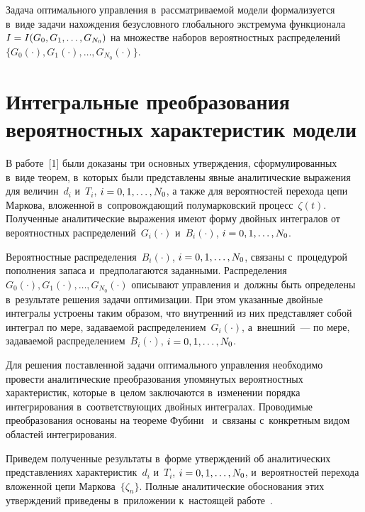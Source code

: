 \begin{multicols}{2}
  Задача оптимального управления в~рас\-смат\-ри\-ва\-емой
   модели формализуется в~виде задачи нахождения без\-услов\-но\-го 
   глобального экст\-ре\-му\-ма функционала 
$I\hm= I(G_0, G_1, \ldots , G_{N_0})$ на множестве наборов вероятностных 
распределений $\{G_0(\cdot), G_1(\cdot), \ldots , G_{N_0}(\cdot)\}$.
  
\section{Интегральные преобразования вероятностных характеристик 
модели}

  В работе~[1] были доказаны три основных утверж\-де\-ния, сформулированных 
в~виде тео\-рем, в~которых были пред\-став\-ле\-ны явные аналитические выражения 
для величин~$d_i$ и~$T_i$, $i\hm=0,1,\ldots , N_0$, а также для вероятностей 
перехода цепи Маркова, вложенной в~со\-про\-вож\-да\-ющий полумарковский 
процесс~$\zeta(t)$. Полученные аналитические выражения име\-ют форму 
двойных интегралов от вероятностных распределений~$G_i(\cdot)$ 
и~$B_i(\cdot)$, $i\hm=0,1,\ldots, N_0$.
  
  Вероятностные распределения~$B_i(\cdot)$, $i\hm=0,1,\ldots ,N_0$, связаны 
с~процедурой пополнения запаса и~пред\-по\-ла\-га\-ют\-ся заданными. 
Рас\-пре\-де\-ле\-ния 
$G_0(\cdot), G_1(\cdot), \ldots , G_{N_0}(\cdot)$ описывают управ\-ле\-ния 
и~должны быть определены в~результате решения задачи оптимизации. При 
этом указанные двойные интегралы устро\-ены таким образом, что внут\-рен\-ний 
из них пред\-став\-ля\-ет собой интеграл по мере, за\-да\-ва\-емой 
распределением~$G_i(\cdot)$, а~внеш\-ний~--- по мере, за\-да\-ва\-емой 
распределением~$B_i(\cdot)$, $i\hm=0,1,\ldots ,N_0$.
  
  Для решения поставленной задачи оптимального управ\-ле\-ния необходимо 
про\-вес\-ти аналитические преобразования упомянутых вероятностных 
характеристик, которые в~целом за\-клю\-ча\-ют\-ся в~изменении порядка 
интегрирования в~со\-от\-вет\-ст\-ву\-ющих двойных интегралах. Проводимые 
пре\-об\-ра\-зо\-ва\-ния основаны на тео\-ре\-ме Фубини~\cite{5-sh} и~связаны 
с~конкретным видом областей интегрирования. 

Приведем полученные 
результаты в~форме утверж\-де\-ний об аналитических пред\-став\-ле\-ни\-ях 
характеристик~$d_i$ и~$T_i$, $i\hm=0,1,\ldots, N_0$, и~вероятностей перехода 
вло\-жен\-ной цепи Маркова~$\{\zeta_n\}$. Пол\-ные аналитические обосно\-ва\-ния 
этих утверж\-де\-ний приведены в~приложении к~на\-сто\-ящей работе~\cite{6-sh}.
  

\end{multicols}
